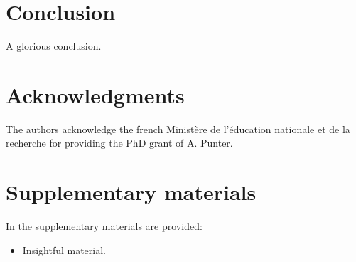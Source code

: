 \documentclass[aip,reprint,nofootinbib]{revtex4-1}
\begin{document}
%
%


\section{Conclusion}

A glorious conclusion.

\section{Acknowledgments}
The authors acknowledge the french Ministère de l'éducation
nationale et de la recherche for providing the PhD grant of A. Punter.

\section{Supplementary materials}
In the supplementary materials are provided:
\begin{itemize}
\item Insightful material.
\end{itemize}


 
\end{document}
